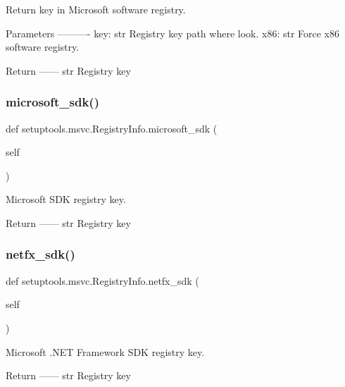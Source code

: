 \begin{DoxyVerb}Return key in Microsoft software registry.

Parameters
----------
key: str
    Registry key path where look.
x86: str
    Force x86 software registry.

Return
------
str
    Registry key
\end{DoxyVerb}
 \mbox{\label{classsetuptools_1_1msvc_1_1RegistryInfo_a5ad942fb235475bd805634ca70652f38}} 
\subsubsection{\texorpdfstring{microsoft\+\_\+sdk()}{microsoft\_sdk()}}
{\footnotesize\ttfamily def setuptools.\+msvc.\+Registry\+Info.\+microsoft\+\_\+sdk (\begin{DoxyParamCaption}\item[{}]{self }\end{DoxyParamCaption})}

\begin{DoxyVerb}Microsoft SDK registry key.

Return
------
str
    Registry key
\end{DoxyVerb}
 \mbox{\label{classsetuptools_1_1msvc_1_1RegistryInfo_aef785998a7042430dbf6ec449a11d4d8}} 
\subsubsection{\texorpdfstring{netfx\+\_\+sdk()}{netfx\_sdk()}}
{\footnotesize\ttfamily def setuptools.\+msvc.\+Registry\+Info.\+netfx\+\_\+sdk (\begin{DoxyParamCaption}\item[{}]{self }\end{DoxyParamCaption})}

\begin{DoxyVerb}Microsoft .NET Framework SDK registry key.

Return
------
str
    Registry key
\end{DoxyVerb}
 \mbox{\label{classsetuptools_1_1msvc_1_1RegistryInfo_a506b2764762140308133a06a02d4285a}} 

